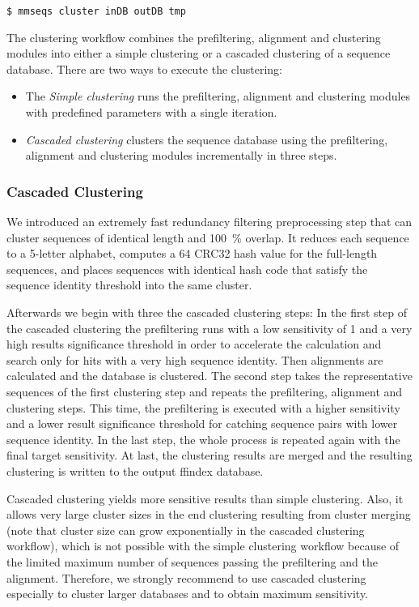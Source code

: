 \documentclass[11pt,a4paper]{scrreprt}
\begin{document}
\begin{verbatim}
$ mmseqs cluster inDB outDB tmp 
\end{verbatim}

The clustering workflow combines the prefiltering, alignment and clustering modules into either a simple clustering or a cascaded clustering of a sequence database. There are two ways to execute the clustering:

\begin{itemize}
\item The \emph{Simple clustering} runs the prefiltering, alignment and clustering
modules with predefined parameters with a single iteration.
\item \emph{Cascaded clustering} clusters the sequence database using the prefiltering, alignment and clustering modules incrementally in three steps.
\end{itemize}

\subsubsection{Cascaded Clustering}
We introduced an extremely fast redundancy filtering preprocessing step that can cluster sequences of identical length and \SI{100}{\percent} overlap. It reduces each sequence to a \num{5}-letter alphabet, computes a \SI{64}{\bit} CRC32 hash value for the full-length sequences, and places sequences with identical hash code that satisfy the sequence identity threshold into the same cluster.

Afterwards we begin with three the cascaded clustering steps: In the first step of the cascaded clustering the prefiltering runs with a low sensitivity of 1 and a very high results significance threshold in order to accelerate the calculation and search only for hits with a very high sequence identity. Then alignments are calculated and the database is clustered. The second step takes the representative sequences of the first clustering step and repeats the prefiltering, alignment and clustering steps. This time, the prefiltering is executed with a higher sensitivity and a lower result significance threshold for catching sequence pairs with lower sequence identity. In the last step, the whole process is repeated again with the final target sensitivity. At last, the clustering results are merged and the resulting clustering is written to the output ffindex database. 

Cascaded clustering yields more sensitive results than simple clustering. Also, it allows very large cluster sizes in the end clustering resulting from cluster merging (note that cluster size can grow exponentially in the cascaded clustering workflow), which is not possible with the simple clustering workflow because of the limited maximum number of sequences passing the prefiltering and the alignment. Therefore, we strongly recommend to use cascaded clustering especially to cluster larger databases and to obtain maximum sensitivity.
\end{document}
